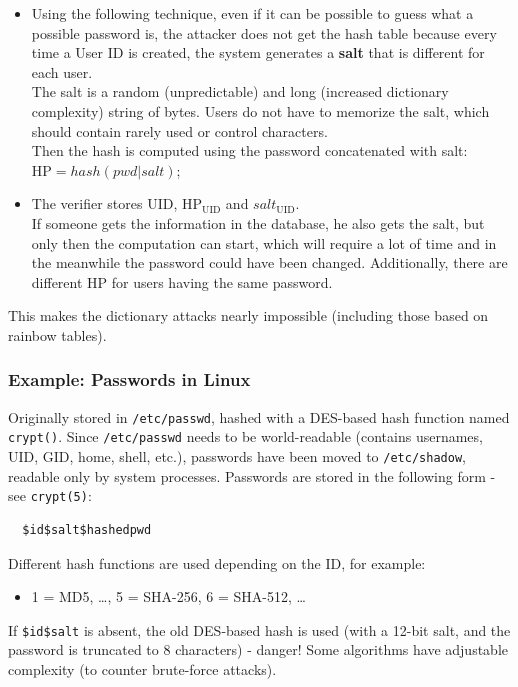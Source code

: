 \begin{itemize}
	\item Using the following technique, even if it can be possible to guess what a possible password is, the attacker
	      does not get the hash table because every time a User ID is created, the system generates a \textbf{salt} that is different for each user.\\
	      The salt is a random (unpredictable) and long (increased dictionary complexity) string of bytes.
	      Users do not have to memorize the salt, which should contain rarely used or control characters.\\
	      Then the hash is computed using the password concatenated with salt:\\
	      $\mathrm{HP} = hash(pwd | salt)$;
	\item The verifier stores UID,
	      $\mathrm{HP}_{\mathrm{UID}}$ and $salt_{\mathrm{UID}}$.\\
	      If someone gets the information in the database, he also gets the salt, but only then the
	      computation can start, which will require a lot of time and in the meanwhile the password could have been
	      changed. Additionally, there are different HP for users having the same password.
\end{itemize}

This makes the dictionary attacks nearly impossible (including those based on rainbow tables).


\subsubsection{Example: Passwords in Linux}
Originally stored in \texttt{/etc/passwd}, hashed with a DES-based
hash function named \texttt{crypt()}.
Since \texttt{/etc/passwd} needs to be world-readable (contains
usernames, UID, GID, home, shell, etc.), passwords have been
moved to \texttt{/etc/shadow}, readable only by system processes.
Passwords are stored in the following form - see \texttt{crypt(5)}:

\begin{verbatim}
  $id$salt$hashedpwd
\end{verbatim}
Different hash functions are used depending on the ID, for example:
\begin{itemize}
	\item 1 = MD5, \ldots, 5 = SHA-256, 6 = SHA-512, \ldots
\end{itemize}
If \texttt{\$id\$salt} is absent, the old DES-based hash is used (with
a 12-bit salt, and the password is truncated to 8 characters) - danger!
Some algorithms have adjustable complexity (to counter brute-force attacks).


